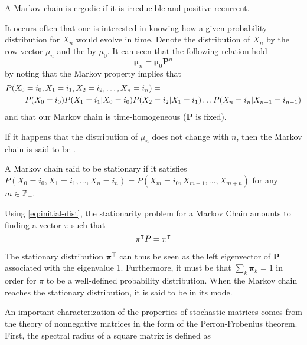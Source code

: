\begin{defn}
A Markov chain is ergodic if it is irreducible and positive recurrent.
\end{defn}

It occurs often that one is interested in knowing how a given probability distribution
for $X_n$ would evolve in time.  Denote the
distribution of $X_n$ by the row vector $\mu_n$ and the 
by $\mu_0$. It can seen that the following relation hold
\begin{equation}
 \mathbf{\mu}_n= \mathbf{\mu}_0 \mathbf{P}^n \label{eq:initial-dist}
\end{equation}
by noting that the Markov property implies that
\begin{align}
P(X_0 &= i_0, X_1 = i_1, X_2 = i_2, \dots, X_n = i_n) = \notag \\
&P(X_0 = i_0) P(X_1 = i_1 | X_0 = i_0) P(X_2 = i_2 | X_1 = i_1) \dots P(X_n = i_n |
X_{n-1} = i_{n-1})
\end{align}
and that our Markov chain is time-homogeneous ($\mathbf{P}$ is fixed).

If it happens that the distribution of $\mu_n$ does not change with $n$, then 
 the Markov chain is said to be . 

\begin{defn}
A Markov chain said to be stationary if it satisfies $P(X_0 = i_0, X_1 = i_1, \dots, X_n
= i_n) = P(X_m = i_0, X_{m+1}, \dots, X_{m+n})$ for any $m \in \mathbb{Z_+}$.
\end{defn}

Using \ref{eq:initial-dist}, the stationarity problem for a Markov Chain amounts to
finding a vector $\pi$ such that
\begin{equation}
\mathbf{\pi}^\intercal P = \mathbf{\pi}^\intercal
\end{equation}

The stationary distribution $\mathbf{\pi}^\intercal$ can thus be seen as the left
eigenvector of $\mathbf{P}$ associated with the eigenvalue 1. Furthermore, it must be
that $\sum_k \mathbf{\pi}_k = 1$ in order for $\pi$ to be a well-defined probability
distribution. When the Markov chain reaches the stationary distribution, it is said to be
in its  mode.

An important characterization of the properties of stochastic matrices comes from the
theory of nonnegative matrices in the form of the Perron-Frobenius theorem. First, the spectral radius of a square matrix is defined as 

